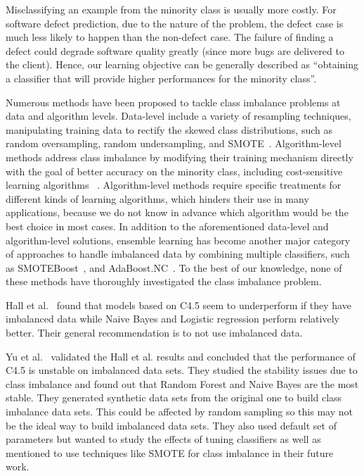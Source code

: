 \documentclass[sigconf,review, anonymous]{acmart}
\theoremstyle{break}
\theoremstyle{break}
\begin{document}
Misclassifying an example from the minority class is usually more costly. For software defect prediction, due to the nature of the problem, the defect case is much less likely to happen than the non-defect case.  The failure of finding a defect could degrade software quality greatly (since more bugs
are delivered to the client). Hence,
our learning objective can be generally described
as ``obtaining a classifier that will provide higher performances for the minority class''.

Numerous methods have been proposed to tackle class
imbalance problems at data and algorithm levels. Data-level include a variety of resampling techniques, manipulating training data to rectify the skewed class distributions, such as random oversampling, random undersampling, and SMOTE~\cite{estabrooks2004multiple}. Algorithm-level methods address class imbalance by
modifying their training mechanism directly with the 
goal of better accuracy on the minority class, including cost-sensitive learning algorithms ~\cite{he2009learning}.
Algorithm-level methods require specific treatments for different
kinds of learning algorithms, which hinders their use
in many applications, because we do not know in advance
which algorithm would be the best choice in most cases. In addition to the aforementioned data-level and algorithm-level solutions, ensemble learning has become another major category of approaches to handle imbalanced data by combining multiple classifiers, such as SMOTEBoost~\cite{chawla2003smoteboost}, and
AdaBoost.NC~\cite{wang2010negative}. To 
the best of our knowledge, none of these methods have  thoroughly investigated the class imbalance problem.

Hall et al.~\cite{hall2012systematic} found that models based on C4.5 seem to underperform if they have imbalanced data while Naive Bayes and Logistic regression perform relatively better. 
Their general recommendation is to not use
imbalanced data.  

Yu et al.~\cite{yuperformance} validated the Hall et al. results and concluded that the
performance of C4.5 is unstable on imbalanced data sets. They studied the stability issues due to  class imbalance and found out that Random Forest and Naive Bayes are the most stable. They generated synthetic data sets from the original one to build class imbalance data sets. This could be affected by random sampling so this may not be the ideal way to build imbalanced data sets. They also used default set of parameters but wanted to study the effects of tuning classifiers as well as mentioned to use techniques like SMOTE for class imbalance in their future work.
\end{document}
